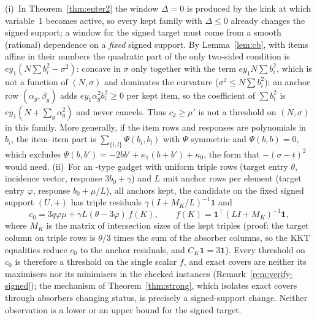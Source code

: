 \begin{remark}\label{rem:gadgets}
(i)~In Theorem~\ref{thm:enter2} the window $\Delta=0$ is produced by the kink at which variable~1 becomes active, so every kept family with $\Delta\le0$ already changes the signed support; a window for the signed target must come from a smooth (rational) dependence on a \emph{fixed} signed support. By Lemma~\ref{lem:cb}, with items affine in their numbers the quadratic part of the only two-sided condition is $ey_1(N\sum b_i^2-\sigma^2)$: concave in $\sigma$ only together with the term $ey_1N\sum b_i^2$, which is not a function of $(N,\sigma)$ and dominates the curvature ($\sigma^2\le N\sum b_i^2$); an anchor row $(\alpha_g,\beta_g)$ adds $ey_1\alpha_g^2b_i^2\ge0$ per kept item, so the coefficient of $\sum b_i^2$ is $ey_1(N+\sum_g\alpha_g^2)$ and never cancels. Thus $c_2\ge\mu'$ is not a threshold on $(N,\sigma)$ in this family. More generally, if the item rows and responses are polynomials in $b_i$, the item--item part is $\sum_{\{i,l\}}\Psi(b_i,b_l)$ with $\Psi$ symmetric and $\Psi(b,b)=0$, which excludes $\Psi(b,b')=-2bb'+\kappa_1(b+b')+\kappa_0$, the form that $-(\sigma-t)^2$ would need. (ii)~For an -type gadget with uniform triple rows (target entry $\theta$, incidence vector, response $3b_0+\gamma$) and $L$ unit anchor rows per element (target entry $\varphi$, response $b_0+\mu/L$), all anchors kept, the candidate on the fixed signed support $(U,+)$ has triple residuals $\gamma(I+M_K/L)^{-1}\mathbf 1$ and
\[
c_0=3q\varphi\mu+\gamma L(\theta-3\varphi)\,f(K),\qquad f(K)=\mathbf 1^{\top}(LI+M_K)^{-1}\mathbf 1,
\]
where $M_K$ is the matrix of intersection sizes of the kept triples (proof: the target column on triple rows is $\theta/3$ times the sum of the absorber columns, so the KKT equalities reduce $c_0$ to the anchor residuals, and $C_K\mathbf 1=3\mathbf 1$). Every threshold on $c_0$ is therefore a threshold on the single scalar $f$, and exact covers are neither its maximisers nor its minimisers in the checked instances (Remark~\ref{rem:verify-signed}); the mechanism of Theorem~\ref{thm:strong}, which isolates exact covers through absorbers changing status, is precisely a signed-support change. Neither observation is a lower or an upper bound for the signed target.
\end{remark}

